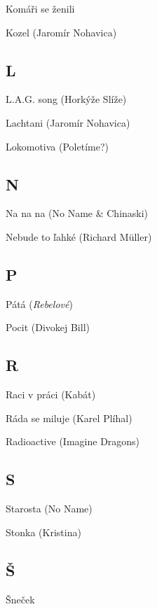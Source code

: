 \begin{multicols}{2}
Komáři se ženili

Kozel (Jaromír Nohavica)

\subsection*{L}
L.A.G. song (Horkýže Slíže)

Lachtani (Jaromír Nohavica)

Lokomotiva (Poletíme?)

\subsection*{N}
Na na na (No Name \& Chinaski)

Nebude to ľahké (Richard Müller)

\subsection*{P}
Pátá (\emph{Rebelové})

Pocit (Divokej Bill)

\subsection*{R}
Raci v práci (Kabát)

Ráda se miluje (Karel Plíhal)

Radioactive (Imagine Dragons)

\subsection*{S}
Starosta (No Name)

Stonka (Kristina)

\subsection*{Š}
Šneček

\end{multicols}


